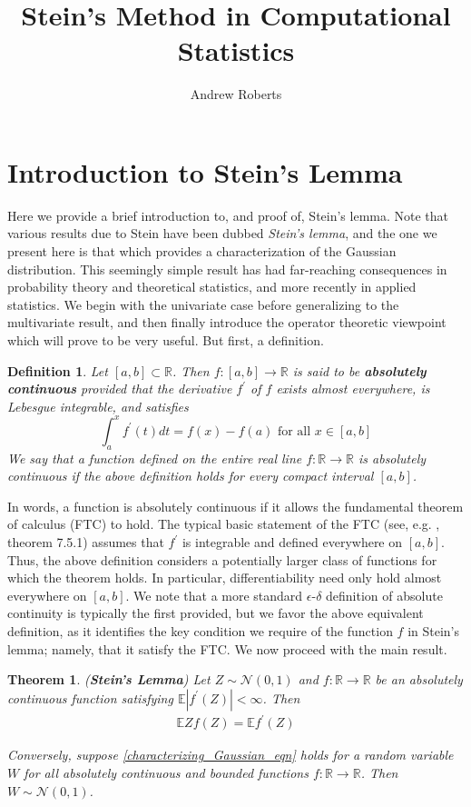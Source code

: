 \documentclass[12pt]{article}
\title{Stein's Method in Computational Statistics}
\author{Andrew Roberts}
\newcommand*{\abs}[1]{\left\lvert#1\right\rvert}
\newcommand{\R}{\mathbb{R}}
\newcommand{\E}{\mathbb{E}}
\newcommand{\Gaussian}{\mathcal{N}}
\newtheorem{definition}{Definition}
\newtheorem{thm}{Theorem}
\begin{document}
\maketitle
\tableofcontents
\newpage

\section{Introduction to Stein's Lemma}
Here we provide a brief introduction to, and proof of, Stein's lemma. Note that various results due to Stein have been dubbed \textit{Stein's lemma}, and the one we present here is that which provides a 
characterization of the Gaussian distribution. This seemingly simple result has had far-reaching consequences in probability theory and theoretical statistics, and more recently in applied statistics. We begin 
with the univariate case before generalizing to the multivariate result, and then finally introduce the operator theoretic viewpoint which will prove to be very useful. But first, a definition. 

\begin{definition}
Let $[a, b] \subset \R$. Then $f: [a, b] \to \R$ is said to be \textbf{absolutely continuous} provided that the derivative $f^\prime$ of $f$ exists almost everywhere, is Lebesgue integrable, and satisfies 
\[
\int_{a}^{x} f^\prime(t) dt = f(x) - f(a) \text{ for all } x \in [a, b]
\]
We say that a function defined on the entire real line $f: \R \to \R$ is absolutely continuous if the above definition holds for every compact interval $[a, b]$. 
\end{definition}
In words, a function is absolutely continuous if it allows the fundamental theorem of calculus (FTC) to hold. The typical basic statement of the FTC
(see, e.g. \cite{Abbott}, theorem 7.5.1) assumes that $f^\prime$ is integrable and defined everywhere on $[a, b]$. Thus, the above definition considers a potentially larger class of functions 
for which the theorem holds. In particular, differentiability need only hold almost everywhere on $[a, b]$. We note that a more standard $\epsilon$-$\delta$ definition of absolute continuity is 
typically the first provided, but we favor the above equivalent definition, as it identifies the key condition we require of the function $f$ in Stein's lemma; namely, that it satisfy the FTC. 
We now proceed with the main result. 

\begin{thm} \label{Steins_lemma}
(\textbf{Stein's Lemma}) Let $Z \sim \Gaussian(0, 1)$ and $f: \R \to \R$ be an absolutely continuous function satisfying $\E\abs{f^\prime(Z)} < \infty$. Then 
\begin{align}
\E Z f(Z) = \E f^\prime(Z) \label{characterizing_Gaussian_eqn}
\end{align}

Conversely, suppose \ref{characterizing_Gaussian_eqn} holds for a random variable $W$ for all absolutely continuous and bounded functions $f: \R \to \R$. 
Then $W \sim \Gaussian(0, 1)$. 
\end{thm}
\end{document}
